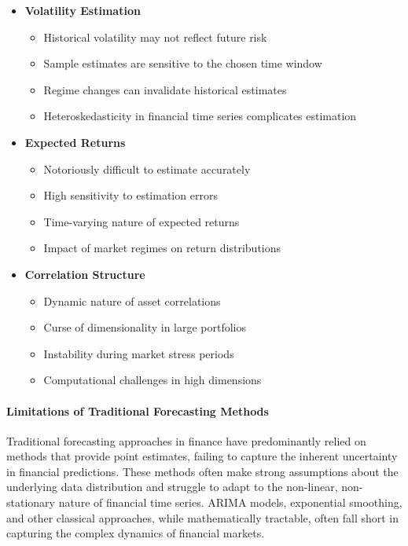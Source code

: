 \begin{itemize}
    \item \textbf{Volatility Estimation}
    \begin{itemize}
        \item Historical volatility may not reflect future risk
        \item Sample estimates are sensitive to the chosen time window
        \item Regime changes can invalidate historical estimates
        \item Heteroskedasticity in financial time series complicates estimation
    \end{itemize}

    \item \textbf{Expected Returns}
    \begin{itemize}
        \item Notoriously difficult to estimate accurately
        \item High sensitivity to estimation errors
        \item Time-varying nature of expected returns
        \item Impact of market regimes on return distributions
    \end{itemize}

    \item \textbf{Correlation Structure}
    \begin{itemize}
        \item Dynamic nature of asset correlations
        \item Curse of dimensionality in large portfolios
        \item Instability during market stress periods
        \item Computational challenges in high dimensions
    \end{itemize}
\end{itemize}

\paragraph{Limitations of Traditional Forecasting Methods}
Traditional forecasting approaches in finance have predominantly relied on methods that provide point estimates, failing to capture the inherent uncertainty in financial predictions. These methods often make strong assumptions about the underlying data distribution and struggle to adapt to the non-linear, non-stationary nature of financial time series. \ac{ARIMA} models, exponential smoothing, and other classical approaches, while mathematically tractable, often fall short in capturing the complex dynamics of financial markets.

